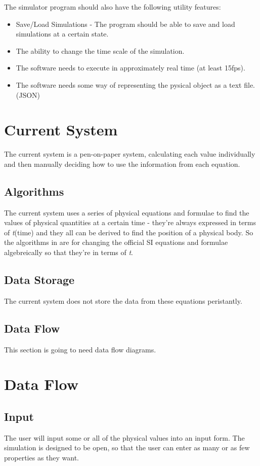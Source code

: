The simulator program should also have the following utility features:
\begin{itemize}
	\item Save/Load Simulations - The program should be able to save and load simulations at a certain state.
	\item The ability to change the time scale of the simulation.
	\item The software needs to execute in approximately real time (at least 15fps).
	\item The software needs some way of representing the pysical object as a text file. (JSON)

\end{itemize}

\section{Current System}
	The current system is a pen-on-paper system, calculating each value individually and then manually deciding how to use the information from each equation.

	\subsection{Algorithms}
		The current system uses a series of physical equations and formulae to find the values of physical quantities at a certain time - they're always expressed in terms of \textit{t}(time) and they all can be derived to find the position of a physical body. So the algorithms in are for changing the official SI equations and formulae algebreically so that they're in terms of \textit{t}.

	\subsection{Data Storage}
		The current system does not store the data from these equations peristantly.

	\subsection{Data Flow}
		This section is going to need data flow diagrams.


\section{Data Flow}
\subsection{Input}
	The user will input some or all of the physical values into an input form. The simulation is designed to be open, so that the user can enter as many or as few properties as they want.

